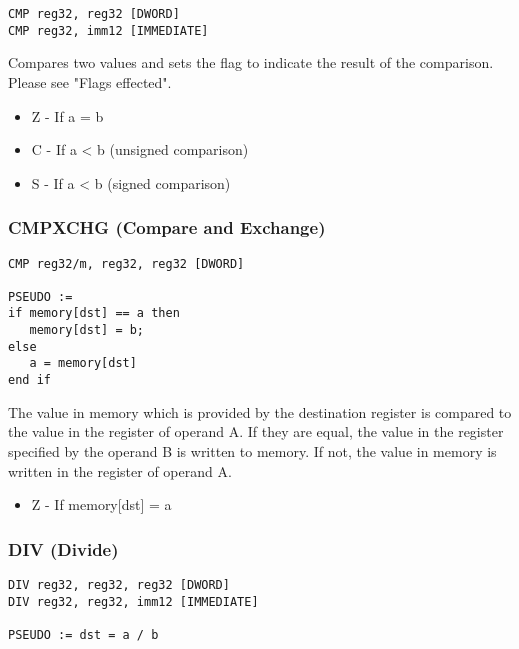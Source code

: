 \begin{verbatim}
CMP reg32, reg32 [DWORD]
CMP reg32, imm12 [IMMEDIATE]
\end{verbatim}


Compares two values and sets the flag to indicate the result of the comparison. Please see "Flags effected".



\begin{itemize}
        \item   Z - If a = b
        \item   C - If a < b (unsigned comparison)
        \item   S - If a < b (signed comparison)
\end{itemize}

\subsubsection{CMPXCHG (Compare and Exchange)}

\begin{verbatim}
CMP reg32/m, reg32, reg32 [DWORD]

PSEUDO :=
if memory[dst] == a then
   memory[dst] = b;
else
   a = memory[dst]
end if
\end{verbatim}


The value in memory which is provided by the destination register is compared to the value in the register of operand A. If they are equal, the value in the register specified by the operand B is written to memory. If not, the value in memory is written in the register of operand A.


\begin{itemize}
        \item   Z - If memory[dst] = a
\end{itemize}

\subsubsection{DIV (Divide)}

\begin{verbatim}
DIV reg32, reg32, reg32 [DWORD]
DIV reg32, reg32, imm12 [IMMEDIATE]

PSEUDO := dst = a / b
\end{verbatim}

